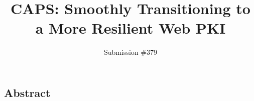 \documentclass[letterpaper,twocolumn,10pt]{article}
\begin{document}
\date{}

\title{
  \Large \bf
  CAPS: Smoothly Transitioning to a More Resilient Web PKI
}
\author{
  Submission \#379
}

\maketitle

\subsection*{Abstract}
















{\footnotesize 
}
\theendnotes
\end{document}
